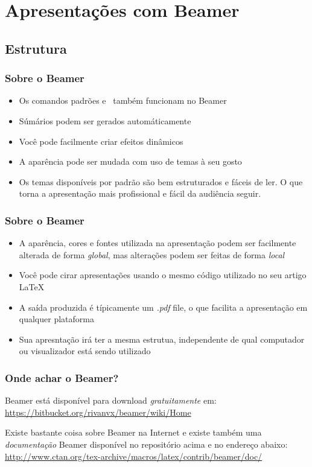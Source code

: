 \section{Apresentações com Beamer}


\subsection[Estrutura]{Estrutura}
\begin{frame}
\frametitle{Sobre o Beamer}
\begin{itemize}
  \item Os comandos padrões e \LaTeXe\ também funcionam no Beamer
  \item Súmários podem ser gerados automáticamente
  \item Você pode facilmente criar efeitos dinâmicos
  \item A aparência pode ser mudada com uso de temas à seu gosto
  \item Os temas disponíveis por padrão são bem estruturados e fáceis de ler. O que torna a
  apresentação mais profissional e fácil da audiência seguir.
\end{itemize}
\end{frame}

\begin{frame}
\frametitle{Sobre o Beamer}
\begin{itemize}
  \item A aparência, cores e fontes utilizada na apresentação podem ser facilmente alterada de forma
  \textit{global}, mas alterações podem ser feitas de forma \textit{local}
  \item Você pode cirar apresentações usando o mesmo código utilizado no seu artigo \LaTeX
  \item A saída produzida é típicamente um \textcolor{darkcerulean}{\textit{.pdf} file}, o que
  facilita a apresentação em qualquer plataforma
  \item {\color{darkcerulean}Sua apresntação irá ter a mesma estrutua, independente de qual
  computador ou visualizador está sendo utilizado}
\end{itemize}
\end{frame}

\begin{frame}
\frametitle{Onde achar o Beamer?}
\begin{center}
Beamer está disponível para download \textcolor{darkcerulean}{\textit{gratuitamente}} em:\newline
\textcolor{darkcerulean}{\url{https://bitbucket.org/rivanvx/beamer/wiki/Home}}
\end{center}
\begin{center}
Existe bastante coisa sobre Beamer na Internet e existe também uma 
\textit{documentação} Beamer disponível no repositório acima e no endereço abaixo: \newline
\url{http://www.ctan.org/tex-archive/macros/latex/contrib/beamer/doc/}
\end{center}
\end{frame}


